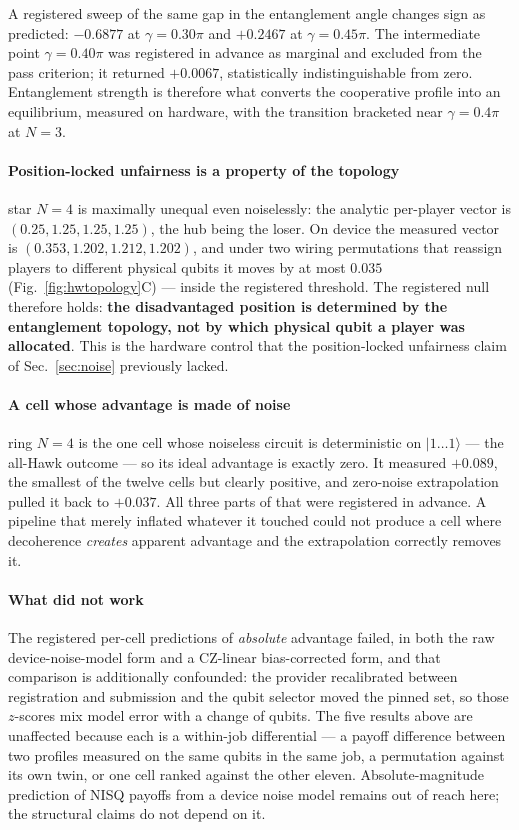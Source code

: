 \documentclass[conference]{IEEEtran}
\newcommand{\ket}[1]{\ensuremath{|#1\rangle}}
\begin{document}
A registered sweep of the same gap in the entanglement angle changes sign as
predicted: $-0.6877$ at $\gamma=0.30\pi$ and $+0.2467$ at $\gamma=0.45\pi$. The
intermediate point $\gamma=0.40\pi$ was registered in advance as marginal and
excluded from the pass criterion; it returned $+0.0067$, statistically
indistinguishable from zero. Entanglement strength is therefore what converts
the cooperative profile into an equilibrium, measured on hardware, with the
transition bracketed near $\gamma=0.4\pi$ at $N{=}3$.

\paragraph{Position-locked unfairness is a property of the topology}
star $N{=}4$ is maximally unequal even noiselessly: the analytic per-player
vector is $(0.25,1.25,1.25,1.25)$, the hub being the loser. On device the
measured vector is $(0.353,1.202,1.212,1.202)$, and under two wiring
permutations that reassign players to different physical qubits it moves by at
most $0.035$ (Fig.~\ref{fig:hwtopology}C) --- inside the registered threshold.
The registered null therefore holds: \textbf{the disadvantaged position is
determined by the entanglement topology, not by which physical qubit a player
was allocated}. This is the hardware control that the position-locked
unfairness claim of Sec.~\ref{sec:noise} previously lacked.

\paragraph{A cell whose advantage is made of noise}
ring $N{=}4$ is the one cell whose noiseless circuit is deterministic on
$\ket{1\ldots1}$ --- the all-Hawk outcome --- so its ideal advantage is exactly
zero. It measured $+0.089$, the smallest of the twelve cells but clearly
positive, and zero-noise extrapolation pulled it back to $+0.037$. All three
parts of that were registered in advance. A pipeline that merely inflated
whatever it touched could not produce a cell where decoherence \emph{creates}
apparent advantage and the extrapolation correctly removes it.

\paragraph{What did not work}
The registered per-cell predictions of \emph{absolute} advantage failed, in
both the raw device-noise-model form and a CZ-linear bias-corrected form, and
that comparison is additionally confounded: the provider recalibrated between
registration and submission and the qubit selector moved the pinned set, so
those $z$-scores mix model error with a change of qubits. The five results
above are unaffected because each is a within-job differential --- a payoff
difference between two profiles measured on the same qubits in the same job, a
permutation against its own twin, or one cell ranked against the other eleven.
Absolute-magnitude prediction of NISQ payoffs from a device noise model remains
out of reach here; the structural claims do not depend on it.
\end{document}
